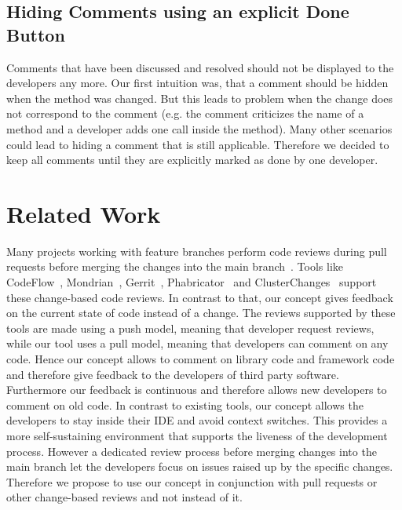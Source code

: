 \documentclass[10pt, conference]{IEEEtran}
\begin{document}
\subsection{Hiding Comments using an explicit Done Button}
Comments that have been discussed and resolved should not be displayed to the developers any more. 
%
Our first intuition was, that a comment should be hidden when the method was changed. 
%
But this leads to problem when the change does not correspond to the comment (e.g. the comment criticizes the name of a method and a developer adds one call inside the method). 
%
Many other scenarios could lead to hiding a comment that is still applicable. 
%
Therefore we decided to keep all comments until they are explicitly marked as done by one developer.  

\section{Related Work}
Many projects working with feature branches perform code reviews during pull requests before merging the changes into the main branch~\cite{driessen2010successful, calefato2015PLE, yu2015pullrequests, tsay2014contributionGithub, gousios2014PullBasedSD, rahman2014pullrequests, tsay2014ContributionDiscussion}. 
%
Tools like CodeFlow~\cite{bird2015CodeReviewPlatform}, Mondrian~\cite{kennedy2006Mondrian}, Gerrit~\cite{google2016gerrit},  Phabricator~\cite{tsotsis2011Phabricator} and ClusterChanges~\cite{barnett2015helpingdevelopers} support these change-based code reviews.
%
In contrast to that, our concept gives feedback on the current state of code instead of a change. 
%
The reviews supported by these tools are made using a push model, meaning that developer request reviews, while our tool uses a pull model, meaning that developers can comment on any code.
%
Hence our concept allows to comment on library code and framework code and therefore give feedback to the developers of third party software. 
%
Furthermore our feedback is continuous and therefore allows new developers to comment on old code. 
%
In contrast to existing tools, our concept allows the developers to stay inside their IDE and avoid context switches. 
%
This provides a more self-sustaining environment that supports the liveness of the development process. 
%
However a dedicated review process before merging changes into the main branch let the developers focus on issues raised up by the specific changes. 
%
Therefore we propose to use our concept in conjunction with pull requests or	 other change-based reviews and not instead of it.
%
\\
\end{document}
